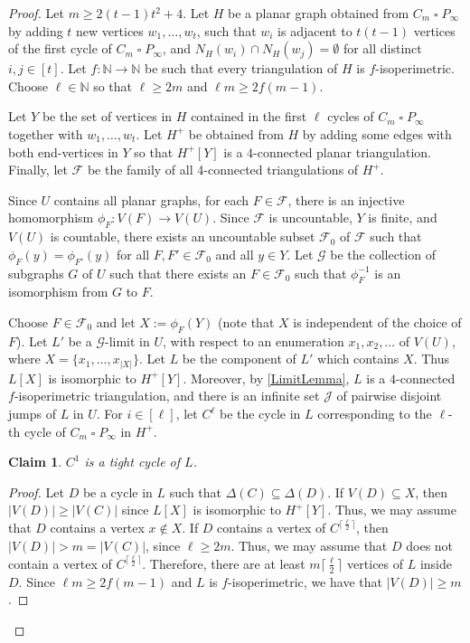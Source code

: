 \documentclass[a4paper,11pt]{article}
\theoremstyle{plain}
\newtheorem{claim}{Claim}[thm]
\theoremstyle{definition}
\newcommand{\CartProd}{\mathbin{\square}}
\renewcommand{\geq}{\geqslant}
\newcommand{\FF}{\mathcal{F}}
\newcommand{\GG}{\mathcal{G}}
\newcommand{\JJ}{\mathcal{J}}
\newcommand{\NN}{\mathbb{N}}
\begin{document}
\begin{proof}
Let $m \geq 2(t-1)t^2+4$. Let $H$ be a planar graph obtained from $C_m \CartProd P_\infty$ by adding $t$ new vertices $w_1, \dots, w_t$, such that $w_i$ is adjacent to $t(t-1)$ vertices of the first cycle of $C_m \CartProd P_\infty$, and $N_H(w_i) \cap N_H(w_j)=\emptyset$ for all distinct $i,j \in [t]$.  Let $f: \NN \to \NN$ be such that every triangulation of $H$ is $f$-isoperimetric.  Choose $\ell \in \NN$ so that $\ell \geq 2m$ and $\ell m \geq 2f(m-1)$.  

Let $Y$ be the set of vertices in $H$ contained in the first $\ell$ cycles of $C_m \CartProd P_\infty$ together with $w_1, \dots, w_t$. Let $H^+$ be obtained from $H$ by adding some edges with both end-vertices in $Y$ so that $H^+[Y] $ is a $4$-connected planar triangulation.  Finally, let $\FF$ be the family of all 4-connected triangulations of $H^+$. 

Since $U$ contains all planar graphs, for each $F \in \FF$, there is an injective homomorphism $\phi_F: V(F) \to V(U)$. Since $\FF$ is uncountable, $Y$ is finite, and $V(U)$ is countable, there exists an uncountable subset $\FF_0$ of $\FF$ such that $\phi_F(y)=\phi_{F'}(y)$ for all $F,F' \in \FF_0$ and all $y \in Y$.  Let $\GG$ be the collection of subgraphs $G$ of $U$ such that there exists an $F \in \FF_0$ such that $\phi_F^{-1}$ is an isomorphism from $G$ to $F$.  

Choose $F \in \FF_0$ and let $X:=\phi_F(Y)$ (note that $X$ is independent of the choice of $F$).  Let $L'$ be a $\GG$-limit in $U$, with respect to an enumeration $x_1, x_2, \dots$ of $V(U)$, where $X=\{x_1,\dots,x_{|X|}\}$.  Let $L$ be the component of $L'$ which contains $X$. Thus $L[X]$ is isomorphic to $H^+[Y]$.  Moreover, by \cref{LimitLemma}, $L$ is a $4$-connected $f$-isoperimetric triangulation, and there is an infinite set $\JJ$ of pairwise disjoint jumps of $L$ in $U$.  For $i \in [\ell]$, let $C^\ell$ be the cycle in $L$ corresponding to the $\ell$-th cycle of $C_m \CartProd P_\infty$ in $H^+$.  

\begin{claim}
$C^1$ is a tight cycle of $L$.
\end{claim}

\begin{proof}
Let $D$ be a cycle in $L$ such that $\Delta(C) \subseteq \Delta(D)$. If $V(D) \subseteq X$, then $|V(D)| \geq |V(C)|$ since $L[X]$ is isomorphic to $H^+[Y]$.  Thus, we may assume that $D$ contains a vertex $x \notin X$.  If $D$ contains a vertex of $C^{\lceil \frac{\ell}{2}\rceil}$, then $|V(D)| >  m = |V(C)|$, since $\ell \geq 2m$.  Thus, we may assume that $D$ does not contain a vertex of $C^{\lceil \frac{\ell}{2}\rceil}$.  Therefore, there are at least $m \lceil \frac{\ell}{2}\rceil$ vertices of $L$ inside $D$.  Since $\ell m \geq 2f(m-1)$ and $L$ is $f$-isoperimetric, we have that $|V(D)| \geq m$.
\end{proof}


\end{proof}
\end{document}
